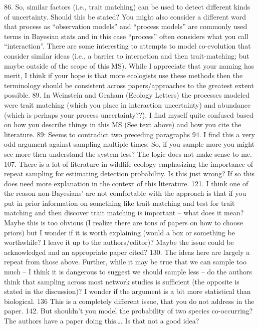 86.  So, similar factors (i.e., trait matching) can be used to detect different kinds of uncertainty.  Should this be stated?  You might also consider a different word that process as “observation models” and “process models” are commonly used terms in Bayesian stats and in this case “process” often considers what you call “interaction”.  There are some interesting to attempts to model co-evolution that consider similar ideas (i.e., a barrier to interaction and then trait-matching; but maybe outside of the scope of this MS). While I appreciate that your naming has merit, I think if your hope is that more ecologists use these methods then the terminology should be consistent across papers/approaches to the greatest extent possible.
89.  In Weinstein and Graham (Ecology Letters) the processes modeled were trait matching (which you place in interaction uncertainty) and abundance (which is perhaps your process uncertainty??).  I find myself quite confused based on how you describe things in this MS (See text above) and how you cite the literature.
89: Seems to contradict two preceding paragraphs
94.  I find this a very odd argument against sampling multiple times.  So, if you sample more you might see more then understand the system less?  The logic does not make sense to me. 
107.  There is a lot of literature in wildlife ecology emphasizing the importance of repeat sampling for estimating detection probability.  Is this just wrong?  If so this does need more explanation in the context of this literature.
121.  I think one of the reason non-Bayesians’ are not comfortable with the approach is that if you put in prior information on something like trait matching and test for trait matching and then discover trait matching is important – what does it mean?  Maybe this is too obvious (I realize there are tons of papers on how to choose priors) but I wonder if it is worth explaining (would a box or something be worthwhile?  I leave it up to the authors/editor)?  Maybe the issue could be acknowledged and an appropriate paper cited?
130.  The ideas here are largely a repeat from those above.  Further, while it may be true that we can sample too much – I think it is dangerous to suggest we should sample less – do the authors think that sampling across most network studies is sufficient (the opposite is stated in the discussion)?  I wonder if the argument is a bit more statistical than biological.
136 This is a completely different issue, that you do not address in the paper.
142.  But shouldn’t you model the probability of two species co-occurring?  The authors have a paper doing this…. Is that not a good idea?
